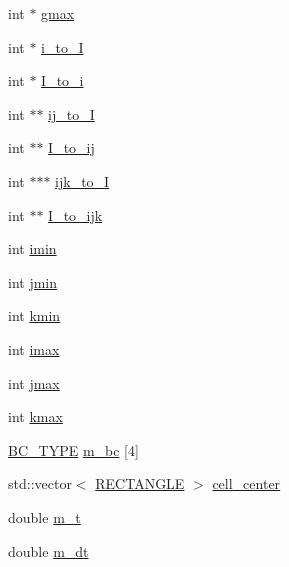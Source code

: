 \begin{DoxyCompactItemize}
\item 
int $\ast$ \hyperlink{class_v_c_a_r_t_e_s_i_a_n_a79ba8a33c59b18b6b4fb166e7bbe7ac2}{gmax}
\item 
int $\ast$ \hyperlink{class_v_c_a_r_t_e_s_i_a_n_ab7827da7c051cb56af5d2009cdc4f7e1}{i\+\_\+to\+\_\+I}
\item 
int $\ast$ \hyperlink{class_v_c_a_r_t_e_s_i_a_n_a251019fbe522effd1d9d3dfae16eb3c7}{I\+\_\+to\+\_\+i}
\item 
int $\ast$$\ast$ \hyperlink{class_v_c_a_r_t_e_s_i_a_n_ad22254fe3475d393483ee3bb4883b006}{ij\+\_\+to\+\_\+I}
\item 
int $\ast$$\ast$ \hyperlink{class_v_c_a_r_t_e_s_i_a_n_a67a1cbab49376baf720a299ef2b32a7c}{I\+\_\+to\+\_\+ij}
\item 
int $\ast$$\ast$$\ast$ \hyperlink{class_v_c_a_r_t_e_s_i_a_n_af1b51139f986553413e595123b839635}{ijk\+\_\+to\+\_\+I}
\item 
int $\ast$$\ast$ \hyperlink{class_v_c_a_r_t_e_s_i_a_n_a4aad3d032e4b17399e007be7be65bcf2}{I\+\_\+to\+\_\+ijk}
\item 
int \hyperlink{class_v_c_a_r_t_e_s_i_a_n_ac25bab9d275aa6e0526423b3640fa736}{imin}
\item 
int \hyperlink{class_v_c_a_r_t_e_s_i_a_n_a34e71fc90a99d794eb2affad7796a375}{jmin}
\item 
int \hyperlink{class_v_c_a_r_t_e_s_i_a_n_af2f2ac1eb784e60c5ce9747e3ae8ae0a}{kmin}
\item 
int \hyperlink{class_v_c_a_r_t_e_s_i_a_n_a7c2350a0419d175d6d2a37aa84da6c05}{imax}
\item 
int \hyperlink{class_v_c_a_r_t_e_s_i_a_n_a48a83a7e36e38650656e44190468a672}{jmax}
\item 
int \hyperlink{class_v_c_a_r_t_e_s_i_a_n_af8c30c6aacca3d265c0d570cc5e15132}{kmax}
\item 
\hyperlink{class_v_c_a_r_t_e_s_i_a_n_aec9ac3665c04ce23f9585c8e2de056f6}{B\+C\+\_\+\+T\+Y\+PE} \hyperlink{class_v_c_a_r_t_e_s_i_a_n_abfd35ac5db8f7503f6733547e3366b11}{m\+\_\+bc} \mbox{[}4\mbox{]}
\item 
std\+::vector$<$ \hyperlink{class_r_e_c_t_a_n_g_l_e}{R\+E\+C\+T\+A\+N\+G\+LE} $>$ \hyperlink{class_v_c_a_r_t_e_s_i_a_n_a4d2be9c1e9e3c768936820d5487af79e}{cell\+\_\+center}
\item 
double \hyperlink{class_v_c_a_r_t_e_s_i_a_n_a048e81e597d523bad0198a733baa4ee3}{m\+\_\+t}
\item 
double \hyperlink{class_v_c_a_r_t_e_s_i_a_n_a9838fdaf5f8bee05adca3d6f569b7df8}{m\+\_\+dt}
\item 
$$
\end{DoxyCompactItemize}
